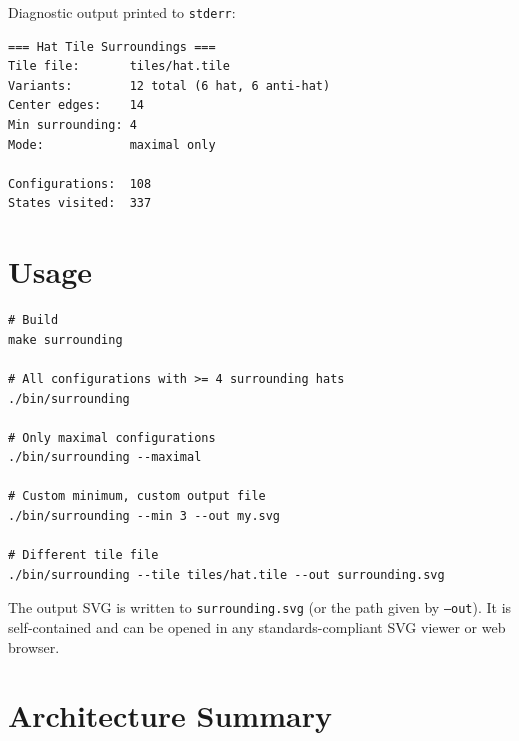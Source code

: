 \documentclass[10pt,a4paper]{article}
\let\polysection\section
\renewcommand\section{\needspace{0.16\textheight}\polysection}
\newcommand{\code}[1]{\texttt{\small #1}}
\begin{document}
Diagnostic output printed to \code{stderr}:
\begin{verbatim}
=== Hat Tile Surroundings ===
Tile file:       tiles/hat.tile
Variants:        12 total (6 hat, 6 anti-hat)
Center edges:    14
Min surrounding: 4
Mode:            maximal only

Configurations:  108
States visited:  337
\end{verbatim}

\section{Usage}

\begin{verbatim}
# Build
make surrounding

# All configurations with >= 4 surrounding hats
./bin/surrounding

# Only maximal configurations
./bin/surrounding --maximal

# Custom minimum, custom output file
./bin/surrounding --min 3 --out my.svg

# Different tile file
./bin/surrounding --tile tiles/hat.tile --out surrounding.svg
\end{verbatim}

The output SVG is written to \code{surrounding.svg} (or the path given
by \code{--out}).  It is self-contained and can be opened in any
standards-compliant SVG viewer or web browser.

\section{Architecture Summary}
\end{document}
